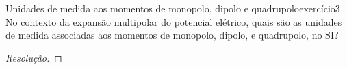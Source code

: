 \begin{exercício}{Unidades de medida aos momentos de monopolo, dipolo e quadrupolo}{exercício3}
    No contexto da expansão multipolar do potencial elétrico, quais são as unidades de medida associadas aos momentos de monopolo, dipolo, e quadrupolo, no SI?
\end{exercício}
\begin{proof}[Resolução]

\end{proof}
